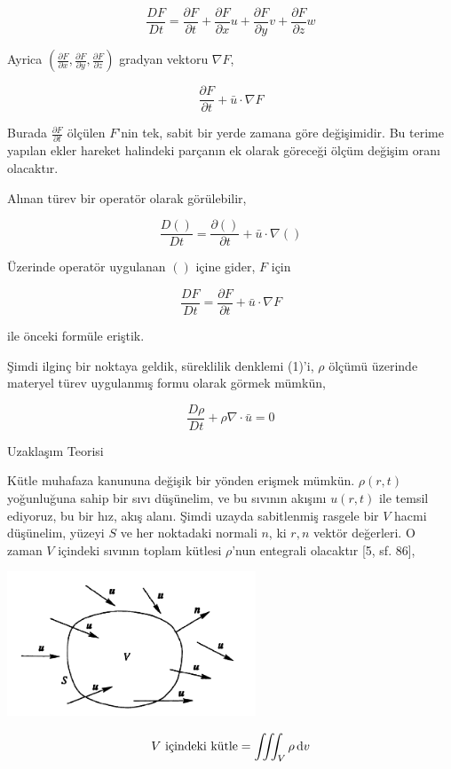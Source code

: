 \documentclass[12pt,fleqn]{article}\usepackage{../../common}
\begin{document}
$$
\frac{D F}{D t} =
\frac{\partial F}{\partial t} +
\frac{\partial F}{\partial x} u + 
\frac{\partial F}{\partial y} v + 
\frac{\partial F}{\partial z} w 
$$

Ayrica $(\frac{\partial F}{\partial x},\frac{\partial F}{\partial y},\frac{\partial F}{\partial z})$
gradyan vektoru $\nabla F$,

$$
\frac{\partial F}{\partial t} + \bar{u} \cdot \nabla F
$$

Burada $\frac{\partial F}{\partial t}$ ölçülen $F$'nin tek, sabit bir yerde
zamana göre değişimidir. Bu terime yapılan ekler hareket halindeki parçanın ek
olarak göreceği ölçüm değişim oranı olacaktır.

Alınan türev bir operatör olarak görülebilir, 

$$
\frac{D ()}{D t} = \frac{\partial () }{\partial t} + \bar{u} \cdot \nabla ()
$$

Üzerinde operatör uygulanan $()$ içine gider, $F$ için

$$
\frac{D F}{D t} = \frac{\partial F}{\partial t} + \bar{u} \cdot \nabla F
$$

ile önceki formüle eriştik.

Şimdi ilginç bir noktaya geldik, süreklilik denklemi (1)'i, $\rho$ ölçümü
üzerinde materyel türev uygulanmış formu olarak görmek mümkün,

$$
\frac{D \rho}{D t} + \rho \nabla \cdot \bar{u} = 0
$$

Uzaklaşım Teorisi 

Kütle muhafaza kanununa değişik bir yönden erişmek mümkün. $\rho(r, t)$
yoğunluğuna sahip bir sıvı düşünelim, ve bu sıvının akışını $u(r, t)$ ile temsil
ediyoruz, bu bir hız, akış alanı. Şimdi uzayda sabitlenmiş rasgele bir $V$ hacmi
düşünelim, yüzeyi $S$ ve her noktadaki normali $n$, ki $r,n$ vektör değerleri. O
zaman $V$ içindeki sıvının toplam kütlesi $\rho$'nun entegrali olacaktır [5, sf. 86],

\includegraphics[width=20em]{phy_050_cons_01.png}

$$
V \textrm{ içindeki kütle} = \iiint_V \rho \,\mathrm{d} v
$$
\end{document}
